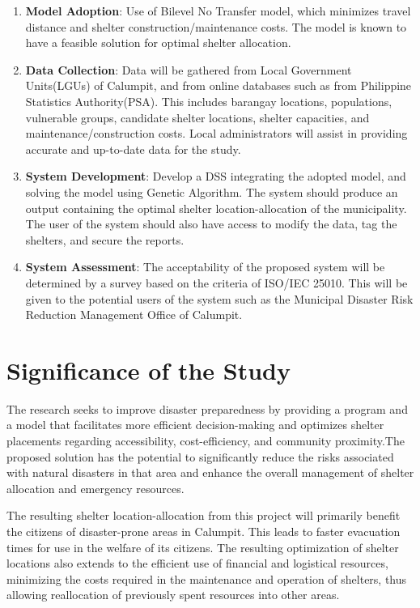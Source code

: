 	\begin{enumerate}
		\item \textbf{Model Adoption}: Use of Bilevel No Transfer model, which minimizes travel distance and shelter construction/maintenance costs. The model is known to have a feasible solution for optimal shelter allocation.

		\item \textbf{Data Collection}: Data will be gathered from Local Government Units(LGUs) of Calumpit, and from online databases such as from Philippine Statistics Authority(PSA). This includes barangay locations, populations, vulnerable groups, candidate shelter locations, shelter capacities, and maintenance/construction costs. Local administrators will assist in providing accurate and up-to-date data for the study.
		
		\item \textbf{System Development}: Develop a DSS integrating the adopted model, and solving the model using Genetic Algorithm. The system should produce an output containing the optimal shelter location-allocation of the municipality. The user of the system should also have access to modify the data, tag the shelters, and secure the reports.
		
		\item \textbf{System Assessment}: The acceptability of the proposed system will be determined by a survey based on the criteria of ISO/IEC 25010. This will be given to the potential users of the system such as the Municipal Disaster Risk Reduction Management Office of Calumpit.
		
	\end{enumerate}

\section{Significance of the Study}
	The research seeks to improve disaster preparedness by providing a program and a model that facilitates more efficient decision-making and optimizes shelter placements regarding accessibility, cost-efficiency, and community proximity.The proposed solution has the potential to significantly reduce the risks associated with natural disasters in that area and enhance the overall management of shelter allocation and emergency resources.
	
	The resulting shelter location-allocation from this project will primarily benefit the citizens of disaster-prone areas in Calumpit. This leads to faster evacuation times for use in the welfare of its citizens. The resulting optimization of shelter locations also extends to the efficient use of financial and logistical resources, minimizing the costs required in the maintenance and operation of shelters, thus allowing reallocation of previously spent resources into other areas.
	
